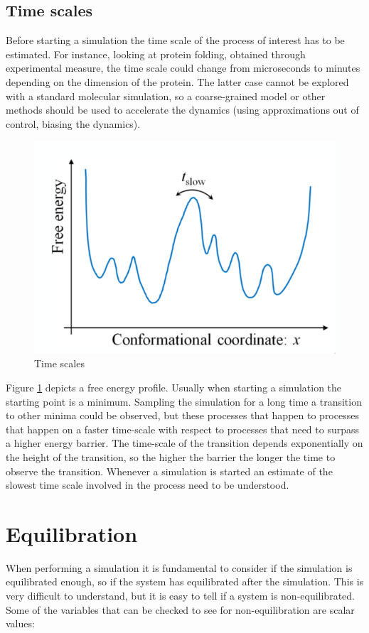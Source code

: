 	\subsection{Time scales}
	Before starting a simulation the time scale of the process of interest has to be estimated.
	For instance, looking at protein folding, obtained through experimental measure, the time scale could change from microseconds to minutes depending on the dimension of the protein.
	The latter case cannot be explored with a standard molecular simulation, so a coarse-grained model or other methods should be used to accelerate the dynamics (using approximations out of control, biasing the dynamics).

	\begin{figure}[H]
		\includegraphics[width = \textwidth]{time-scales}
		\caption{Time scales}
		\label{fig:time-scales}
	\end{figure}

	Figure \ref{fig:time-scales} depicts a free energy profile.
	Usually when starting a simulation the starting point is a minimum.
	Sampling the simulation for a long time a transition to other minima could be observed, but these processes that happen to processes that happen on a faster time-scale with respect to processes that need to surpass a higher energy barrier.
	The time-scale of the transition depends exponentially on the height of the transition, so the higher the barrier the longer the time to observe the transition.
	Whenever a simulation is started an estimate of the slowest time scale involved in the process need to be understood.



\section{Equilibration}
When performing a simulation it is fundamental to consider if the simulation is equilibrated enough, so if the system has equilibrated after the simulation.
This is very difficult to understand, but it is easy to tell if a system is non-equilibrated.
Some of the variables that can be checked to see for non-equilibration are scalar values:

